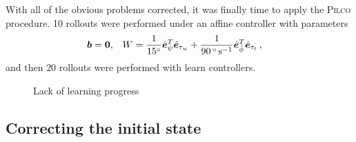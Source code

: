 \documentclass[main.tex]{subfiles}
\begin{document}

	With all of the obvious problems corrected, it was finally time to apply the \textsc{Pilco} procedure.
	10 rollouts were performed under an affine controller with parameters
	\begin{align}
		\bm{b} &= \bm{0}, &
		W &=
			\frac{1}{\SI{15}{\degree}}
			\hat{\bm{e}}_{\psi}^T\hat{\bm{e}}_{\tau_w}
			+ \frac{1}{\SI{90}{\degree\per\second}}
			\hat{\bm{e}}_{\dot\phi}^T\hat{\bm{e}}_{\tau_t}\,,
	\end{align}
	and then $20$ rollouts were performed with learn controllers.
	\begin{figure}
		
		\caption{Lack of learning progress}
	\end{figure}

	\subsection{Correcting the initial state}


\bib
\end{document}
